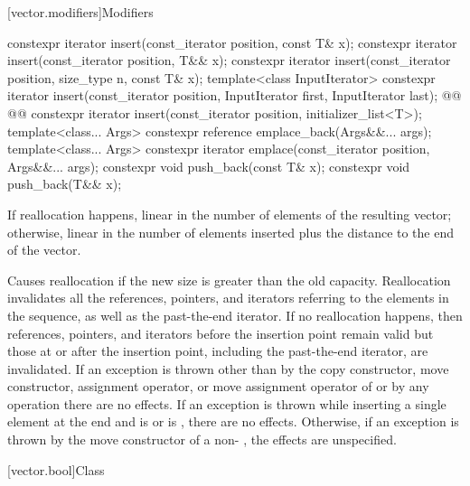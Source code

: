 \documentclass{wg21}
\begin{document}
[vector.modifiers]{Modifiers}

%
\begin{itemdecl}
    constexpr iterator insert(const_iterator position, const T& x);
    constexpr iterator insert(const_iterator position, T&& x);
    constexpr iterator insert(const_iterator position, size_type n, const T& x);
    template<class InputIterator>
    constexpr iterator insert(const_iterator position, InputIterator first, InputIterator last);
    @@
    @@
    constexpr iterator insert(const_iterator position, initializer_list<T>);
    template<class... Args> constexpr reference emplace_back(Args&&... args);
    template<class... Args> constexpr iterator emplace(const_iterator position, Args&&... args);
    constexpr void push_back(const T& x);
    constexpr void push_back(T&& x);
\end{itemdecl}

\begin{itemdescr}
    \pnum
    \complexity
    If reallocation happens,
    linear in the number of elements of the resulting vector;
    otherwise,
    linear in the number of elements inserted plus the distance
    to the end of the vector.

    \pnum
    \remarks
    Causes reallocation if the new size is greater than the old capacity.
    Reallocation invalidates all the references, pointers, and iterators
    referring to the elements in the sequence, as well as the past-the-end iterator.
    If no reallocation happens, then
    references, pointers, and iterators
    before the insertion point remain valid
    but those at or after the insertion point,
    including the past-the-end iterator,
    are invalidated.
    If an exception is thrown other than by
    the copy constructor, move constructor,
    assignment operator, or move assignment operator of
     or by any  operation
    there are no effects.
    If an exception is thrown while inserting a single element at the end and
     is  or 
    is , there are no effects.
    Otherwise, if an exception is thrown by the move constructor of a non-
    , the effects are unspecified.
\end{itemdescr}

[vector.bool]{Class }
\end{document}
